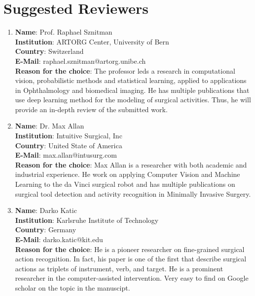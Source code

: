 \newpage
\section*{Suggested Reviewers}
\begin{enumerate}
    
    
\item 
\textbf{Name}: Prof. Raphael Sznitman \\
\textbf{Institution}: ARTORG Center, University of Bern\\
\textbf{Country}: Switzerland\\
\textbf{E-Mail}:  raphael.sznitman@artorg.unibe.ch\\
\textbf{Reason for the choice}: The professor leds a research in computational vision, probabilistic methods and statistical learning, applied to applications in Ophthalmology and biomedical imaging. He has multiple publications that use deep learning method for the modeling of surgical activities. Thus, he will provide an in-depth review of the submitted work.



\item 
\textbf{Name}: Dr. Max Allan \\
\textbf{Institution}: Intuitive Surgical, Inc\\
\textbf{Country}: United State of America\\
\textbf{E-Mail}: max.allan@intusurg.com\\
\textbf{Reason for the choice}: Max Allan is a researcher with both academic and industrial experience. He work on applying Computer Vision and Machine Learning to the da Vinci surgical robot and has multiple publications on surgical tool detection and activity recognition in Minimally Invasive Surgery.



\item 
\textbf{Name}: Darko Katic\\
\textbf{Institution}: Karlsruhe Institute of Technology\\
\textbf{Country}: Germany\\
\textbf{E-Mail}: darko.katic@kit.edu\\
\textbf{Reason for the choice}: He is a pioneer researcher on fine-grained surgical action recognition. In fact, his paper is one of the first that describe surgical actions as triplets of instrument, verb, and target. He is a prominent researcher in the computer-assisted intervention. Very easy to find on Google scholar on the topic in the manuscipt.

\end{enumerate}




